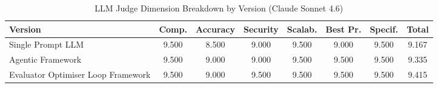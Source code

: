 \begin{table}[htbp]
\centering
\caption{LLM Judge Dimension Breakdown by Version (Claude Sonnet 4.6)}
\label{tab:judge_breakdown_version_claude}
\begin{tabular}{lccccccc}
\toprule
Version & Comp. & Accuracy & Security & Scalab. & Best Pr. & Specif. & Total \\
\midrule
Single Prompt LLM & 9.500 & 8.500 & 9.000 & 9.500 & 9.000 & 9.500 & 9.167 \\
Agentic Framework & 9.500 & 9.000 & 9.000 & 9.500 & 9.500 & 9.500 & 9.335 \\
Evaluator Optimiser Loop Framework & 9.500 & 9.000 & 9.500 & 9.500 & 9.500 & 9.500 & 9.415 \\
\bottomrule
\end{tabular}
\end{table}